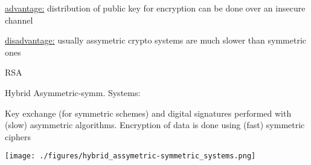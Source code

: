 \documentclass[landscape, a4paper]{article}
\begin{document}
\begin{minipage}[t]{0.2\linewidth}
\begin{betterlist}
\begin{betterlist}
			\item \underline{advantage:} distribution of public key for encryption can be done over an insecure channel
			\item \underline{disadvantage:} usually assymetric crypto systems are much slower than symmetric ones
			\item \alert{RSA}
		\end{betterlist}
		\item \alert{Hybrid Asymmetric-symm. Systems:}
		\begin{betterlist}
			\item Key exchange (for symmetric schemes) and digital signatures performed with (slow) asymmetric algorithms. Encryption of data is done using (fast) symmetric ciphers
		\end{betterlist}
		\texttt{[image: ./figures/hybrid\_assymetric-symmetric\_systems.png]}
	\end{betterlist}
\end{minipage}
\end{document}
